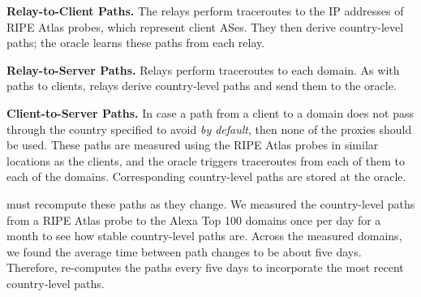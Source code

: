 {\bf Relay-to-Client Paths.} The \system{} relays perform
traceroutes to the IP addresses of RIPE Atlas probes, which 
represent client ASes.  They then derive country-level paths; the
oracle learns these paths from each relay.  

{\bf Relay-to-Server Paths.} Relays perform 
traceroutes to each domain.  As with paths to clients,
relays derive country-level paths and send them to the oracle.

{\bf Client-to-Server Paths.} In case a path from a client to a 
domain does not pass through the country specified to avoid {\it by default}, 
then none of the proxies should be used.  
These paths are measured using the RIPE Atlas probes in similar
locations as the clients, and the oracle triggers traceroutes from
each of them to each of the domains.  Corresponding country-level
paths are stored at the oracle.

\system{} must recompute these paths as they change. We measured the country-level paths from a RIPE Atlas probe to the 
Alexa Top 100 domains once per day for a month to see how stable country-level paths 
are.  Across the measured domains, we found the average time between path changes to 
be about five days.  Therefore, \system{} re-computes the paths every five days to incorporate the 
most recent country-level paths.  





